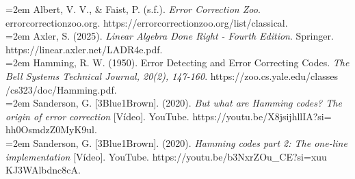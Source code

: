 \documentclass{article}
\begin{document}
\noindent\hangindent=2em 
Albert, V. V., \& Faist, P. (s.f.). \textit{Error Correction Zoo}. errorcorrectionzoo.org. https://errorcorrectionzoo.org/list/classical. \\

\noindent\hangindent=2em 
Axler, S. (2025). \textit{Linear Algebra Done Right - Fourth Edition}. Springer. https://linear.axler.net/LADR4e.pdf.\\

\noindent\hangindent=2em 
Hamming, R. W. (1950). Error Detecting and Error Correcting Codes. \textit{The Bell Systems Technical Journal, 20(2), 147-160}. https://zoo.cs.yale.edu/classes\\/cs323/doc/Hamming.pdf. \\

\noindent\hangindent=2em 
Sanderson, G. [3Blue1Brown]. (2020). \textit{But what are Hamming codes? The origin of error correction} [Vídeo]. YouTube. https://youtu.be/X8jsijhllIA?si=\\hh0OsmdzZ0MyK9ul. \\

\noindent\hangindent=2em 
Sanderson, G. [3Blue1Brown]. (2020). \textit{Hamming codes part 2: The one-line implementation} [Vídeo]. YouTube. https://youtu.be/b3NxrZOu\_CE?si=xuu\\KJ3WAlbdnc8cA. \\
\end{document}
